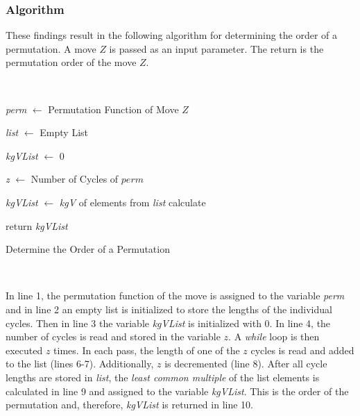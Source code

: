 \documentclass[12pt,a4paper]{article}
\theoremstyle{custom}
\begin{document}
\subsubsection*{Algorithm}

These findings result in the following algorithm for determining the order of a permutation. A move $Z$ is passed as an input parameter. The return is the permutation order of the move $Z$.\newpage

\begin{minipage}[H]{0.14\textwidth}
      $\ $
\end{minipage}
\begin{minipage}[H]{0.72\textwidth}
\begin{algorithm}[H]
\LinesNumbered
\DontPrintSemicolon
{}
\BlankLine
 \textit{perm} $\leftarrow$ Permutation Function of Move $Z$\;

  \textit{list} $\leftarrow$ Empty List \;
  
  \textit{kgVList} $\leftarrow$ 0 \;

  \textit{z} $\leftarrow$ Number of Cycles of $perm$ \; 

  \textit{kgVList} $\leftarrow$ \textit{kgV} of elements from  \textit{list} calculate \;

 return \textit{kgVList} \;

\caption{Determine the Order of a Permutation} 
\label{Algorithm_OrderPermutation}
\end{algorithm}
\end{minipage}
\begin{minipage}[H]{0.14\textwidth}
      $\ $
\end{minipage}

In line 1, the permutation function of the move is assigned to the variable \textit{perm} and in line 2 an empty list is initialized to store the lengths of the individual cycles. Then in line 3 the variable \textit{kgVList} is initialized with 0. In line 4, the number of cycles is read and stored in the variable $z$. A \textit{while} loop is then executed $z$ times. In each pass, the length of one of the $z$ cycles is read and added to the list (lines 6-7). Additionally, $z$ is decremented (line 8). After all cycle lengths are stored in \textit{list}, the \textit{least common multiple} of the list elements is calculated in line 9 and assigned to the variable \textit{kgVList}. This is the order of the permutation and, therefore, \textit{kgVList} is returned in line 10.
\end{document}
